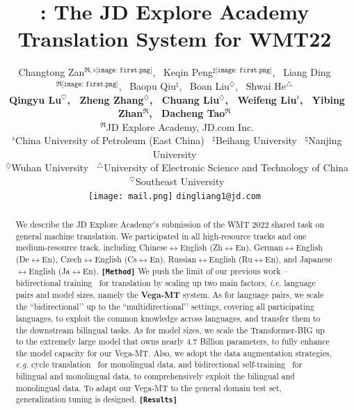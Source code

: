 \documentclass[11pt,a4paper]{article}
\title{\text{\begin{LARGE}{Vega-MT}\end{LARGE}}: The JD Explore Academy Translation System for WMT22}
\author{Changtong Zan$^{\Re,\flat \texttt{[image: first.png]}}$,
\ Keqin Peng$^{\sharp  \texttt{[image: first.png]}}$, 
\ Liang Ding$^{\Re  \texttt{[image: first.png]}}$, 
\ Baopu Qiu$^{\natural}$, 
\ Boan Liu$^{\diamondsuit}$, 
\ Shwai He$^{\triangle}$
\\ 
\ \textbf{Qingyu Lu$^{\heartsuit}$, 
\ Zheng Zhang$^{\diamondsuit}$, 
\ Chuang Liu$^{\diamondsuit}$, 
\ Weifeng Liu$^{\flat}$, 
\ Yibing Zhan$^{\Re}$, 
\ Dacheng Tao$^{\Re}$} \\
\ $^{\Re}$JD Explore Academy, JD.com Inc. \\
\ $^{\flat}$China University of Petroleum (East China) 
\ $^{\sharp}$Beihang University
\ $^{\natural}$Nanjing University\\
\ $^{\diamondsuit}$Wuhan University
\ $^{\triangle}$University of Electronic Science and Technology of China
\ $^{\heartsuit}$Southeast University\\
\texttt{[image: mail.png]} \texttt{dingliang1@jd.com}
}
\newcommand{\zct}{\color{black}}
\begin{document}
\maketitle
\renewcommand{\thefootnote}{\fnsymbol{footnote}}
\begin{abstract}
We describe the JD Explore Academy's submission of the WMT 2022 {\zct shared task on general machine translation}. We participated in all high-resource tracks and one medium-resource track, including Chinese$\leftrightarrow$English (Zh$\leftrightarrow$En), German$\leftrightarrow$English (De$\leftrightarrow$En), Czech$\leftrightarrow$English (Cs$\leftrightarrow$En), Russian$\leftrightarrow$English (Ru$\leftrightarrow$En), and Japanese$\leftrightarrow$English (Ja$\leftrightarrow$En). 
\texttt{\bf [Method]}
We push the limit of our previous work -- bidirectional training~\cite{ding2021improving} for translation by scaling up two main factors, \textit{i.e.} language pairs and model sizes, namely the \textbf{Vega-MT} system. As for language pairs, we scale the ``bidirectional’’ up to the ``multidirectional’’ settings, covering all participating languages, to exploit the common knowledge across languages, and transfer them to the downstream bilingual tasks.  As for model sizes, we scale the Transformer-\textsc{BIG} up to the extremely large model that owns nearly 4.7 Billion parameters, to fully enhance the model capacity for our Vega-MT. Also, we adopt the data augmentation strategies, \textit{e.g.} cycle translation~\cite{ding2019usyd} for monolingual data, and bidirectional self-training~\cite{ding2021usyd} for bilingual and monolingual data, to comprehensively exploit the bilingual and monolingual data. To adapt our Vega-MT to the general domain test set, generalization tuning is designed.
\texttt{\bf [Results]}

\end{abstract}
\end{document}
